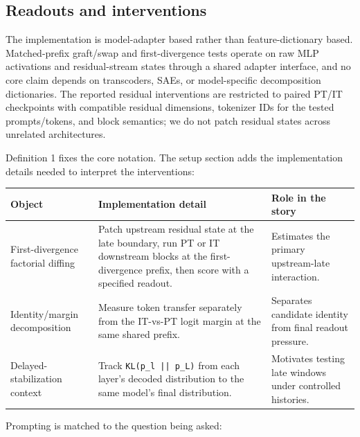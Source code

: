 \documentclass[11pt]{article}
\begin{document}
\subsection{Readouts and interventions}

The implementation is model-adapter based rather than feature-dictionary based. Matched-prefix graft/swap and first-divergence tests operate on raw MLP activations and residual-stream states through a shared adapter interface, and no core claim depends on transcoders, SAEs, or model-specific decomposition dictionaries. The reported residual interventions are restricted to paired PT/IT checkpoints with compatible residual dimensions, tokenizer IDs for the tested prompts/tokens, and block semantics; we do not patch residual states across unrelated architectures.

Definition 1 fixes the core notation. The setup section adds the implementation details needed to interpret the interventions:

\begin{table}[t]
\centering
\small
\setlength{\tabcolsep}{3pt}
\begin{tabularx}{\linewidth}{@{}>{\raggedright\arraybackslash}X >{\raggedright\arraybackslash}X >{\raggedright\arraybackslash}X@{}}
\toprule
Object & Implementation detail & Role in the story \\
\midrule
First-divergence factorial diffing & Patch upstream residual state at the late boundary, run PT or IT downstream blocks at the first-divergence prefix, then score with a specified readout. & Estimates the primary upstream-late interaction. \\
Identity/margin decomposition & Measure token transfer separately from the IT-vs-PT logit margin at the same shared prefix. & Separates candidate identity from final readout pressure. \\
Delayed-stabilization context & Track \texttt{KL(p\_l || p\_L)} from each layer's decoded distribution to the same model's final distribution. & Motivates testing late windows under controlled histories. \\
\bottomrule
\end{tabularx}
\end{table}

Prompting is matched to the question being asked:
\end{document}
